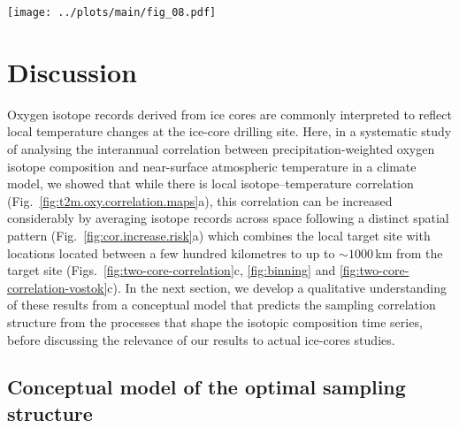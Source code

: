 \documentclass[cp, manuscript]{copernicus}
\begin{document}
\begin{figure*}[t]%
\centering
\texttt{[image: ../plots/main/fig\_08.pdf]}
\caption{%
  Correlation increase and risk of adverse sampling. (\textbf{a}) The increase
  in average correlation with the target temperature at the EDML (red) and
  Vostok (blue) sites depending on the number of locations used for averaging
  the $\delta^{18}\mathrm{O}^{\mathrm{(pw)}}$ time series. Sampling is performed
  either from the innermost ring only (dashed lines), or from all possible
  individual combinations of locations for the respective optimal ring
  combination determined for each $N$ (solid lines). (\textbf{b}) Histogram of
  all possible individual correlations for sampling from the optimal ring
  combination when averaging $N=3$ locations compared to the correlation
  (vertical lines) for sampling from the innermost ring only, displayed for the
  EDML (red) and Vostok (blue) target sites.}
\label{fig:cor.increase.risk}%
\end{figure*}%

\section{Discussion}\label{discussion}

Oxygen isotope records derived from ice cores are commonly interpreted to
reflect local temperature changes at the ice-core drilling site. Here, in a
systematic study of analysing the interannual correlation between
precipitation-weighted oxygen isotope composition and near-surface atmospheric
temperature in a climate model, we showed that while there is local
isotope--temperature correlation (Fig.~\ref{fig:t2m.oxy.correlation.maps}a),
this correlation can be increased considerably by averaging isotope records
across space following a distinct spatial pattern
(Fig.~\ref{fig:cor.increase.risk}a) which combines the local target site with
locations located between a few hundred kilometres to up to $\sim1000$\,km from
the target site (Figs.~\ref{fig:two-core-correlation}c, \ref{fig:binning} and
\ref{fig:two-core-correlation-vostok}c). In the next section, we develop a
qualitative understanding of these results from a conceptual model that predicts
the sampling correlation structure from the processes that shape the isotopic
composition time series, before discussing the relevance of our results to
actual ice-cores studies.

\subsection{Conceptual model of the optimal sampling structure}
\label{discussion:concept.model}
\end{document}
